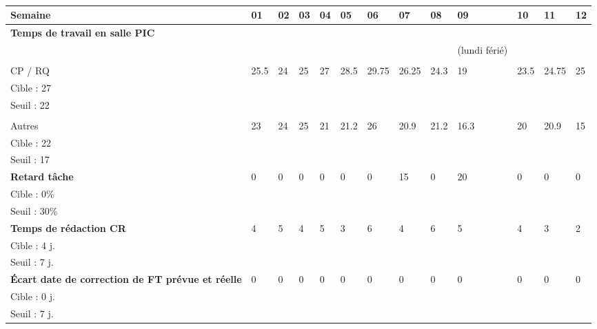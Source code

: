 \documentclass[asi,sansVersion]{picInsa}
\begin{document}
	\begin{landscape}
	\begin{center}
		\LARGE
		\textsc{
			\TB{}\\
		}
	\end{center}
	\vspace{0.5cm}


		\begin{longtable}{|p{2.2cm}|p{1cm}|p{1cm}|p{1cm}|p{1cm}|p{1cm}|p{1cm}|p{1cm}|p{1cm}|p{1cm}|p{1cm}|p{1cm}|p{1cm}|}
			\hline
			\rowcolor[gray]{0.85}
			Semaine & 01 & 02 & 03 & 04 & 05 & 06 & 07 & 08 & 09 & 10 & 11 & 12 \\\hline
			\textbf{Temps de travail en salle PIC} &  &  &  &  &  &  &  &  &  &  &  &\\ 
			&  &  &  &  &  &  &  &  & (lundi férié) &  &  &\\
			&  &  &  &  &  &  &  &  &  &  &  &\\
			CP / RQ & 25.5 & 24 & 25 & 27 & 28.5 & 29.75 & 26.25 & 24.3 & 19 & 23.5 & 24.75 & 25 \\
			Cible : 27 &  &  &  &  &  &  &  &  &  &  &  &\\
			Seuil : 22 &  &  &  &  &  &  &  &  &  &  &  &\\
			&  &  &  &  &  &  &  &  &  &  &  &\\
			Autres & 23 & 24 & 25 & 21 & 21.2 & 26 & 20.9 & 21.2 & 16.3 & 20 & 20.9 & 15\\
			Cible : 22 &  &  &  &  &  &  &  &  &  &  &  &\\
			Seuil : 17 &  &  &  &  &  &  &  &  &  &  &  &\\\hline
			\textbf{Retard tâche} & 0 & 0 & 0 & 0 & 0 & 0 & 15 & 0 & 20 & 0 & 0 & 0 \\
			Cible : 0\% &  &  &  &  &  &  &  &  &  &  &  &\\
			Seuil : 30\% &  &  &  &  &  &  &  &  &  &  &  &\\\hline
			\textbf{Temps de rédaction CR} & 4 & 5 & 4 & 5 & 3 & 6 & 4 & 6 & 5 & 4 & 3 & 2 \\
			Cible : 4 j. &  &  &  &  &  &  &  &  &  &  &  &\\
			Seuil : 7 j. &  &  &  &  &  &  &  &  &  &  &  &\\\hline
			\textbf{Écart date de correction de FT prévue et réelle} & 0 & 0 & 0 & 0 & 0 & 0 & 0 & 0 & 0 & 0 & 0 & 0 \\
			Cible : 0 j. &  &  &  &  &  &  &  &  &  &  &  &\\
			Seuil : 7 j. &  &  &  &  &  &  &  &  &  &  &  &\\\hline
			
		\end{longtable}
	\end{landscape}
\end{document}
